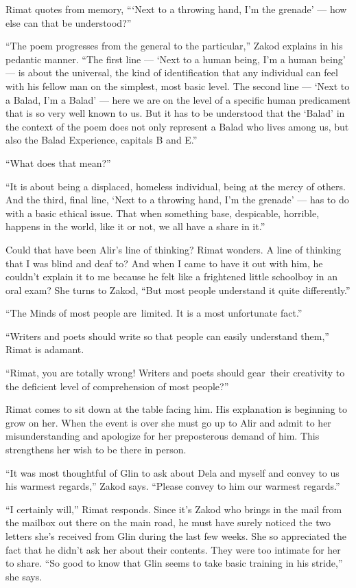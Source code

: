 \documentclass[twoside,11pt,openany]{book}
\begin{document}
Rimat quotes from memory, ``{\thinspace}`Next to a throwing hand, I'm the grenade' --- how else can that be
understood?''

``The poem progresses from the general to the particular,'' Zakod explains in his pedantic
manner. ``The first line --- `Next to a human being, I'm a human being' --- is about the universal, the kind
of identification that any individual can feel with his fellow man on the simplest, most basic level. The second line
--- `Next to a Balad, I'm a Balad' --- here we are on the level of a specific human predicament that is so very well
known to us. But it has to be understood that the `Balad' in the context of the poem does not only represent a Balad
who lives among us, but also the Balad Experience, capitals B and E.''

{}``What does that mean?''

``It is about being a displaced, homeless individual, being at the mercy of others. And the third, final
line, `Next to a throwing hand, I'm the grenade' --- has to do with a basic ethical issue. That when something base,
despicable, horrible, happens in the world, like it or not, we all have a share in
it.''

Could that have been Alir's line of thinking?  Rimat wonders.  A line of thinking that I was blind and deaf to? And
when I came to have it out with him, he couldn't explain it to me because he felt like a frightened little schoolboy in
an oral exam? She turns to{ }Zakod, ``But most people understand
it quite differently.''

``The Minds of most people are~limited. It is a most unfortunate fact.''

``Writers and poets should write so that people can easily understand them,'' Rimat is
adamant.

``Rimat, you are totally wrong! Writers and poets should gear~their creativity to the deficient level of
comprehension of most people?''

Rimat comes to sit down at the table facing him. His explanation is beginning to grow on her. When the event is over she
must go up to Alir and admit to her misunderstanding and apologize for her preposterous demand of him. This strengthens
her wish to be there in person.

``It was most thoughtful of Glin to ask about Dela and{ }myself and convey to us his
warmest regards,'' Zakod says. ``Please convey to him our warmest regards.''

``I certainly will,'' Rimat responds. Since it's Zakod who brings in the mail from the mailbox
out there on the main road, he must have surely noticed   the two letters she's received from Glin during the last
few weeks. She so appreciated the fact that he didn't ask her about their contents. They were too intimate for her to
share. ``So good to know that Glin seems to take basic training in his stride,'' she says.
\end{document}
